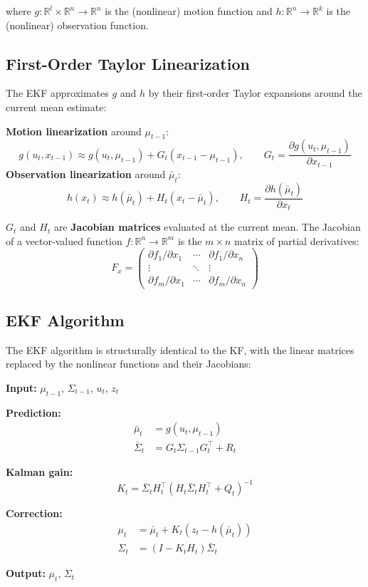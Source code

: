 \documentclass[11pt,a4paper]{article}
\theoremstyle{definition}
\theoremstyle{plain}
\theoremstyle{remark}
\begin{document}
where $g: \mathbb{R}^l \times \mathbb{R}^n \to \mathbb{R}^n$ is the (nonlinear) motion function and $h: \mathbb{R}^n \to \mathbb{R}^k$ is the (nonlinear) observation function.

\subsection{First-Order Taylor Linearization}

The EKF approximates $g$ and $h$ by their first-order Taylor expansions around the current mean estimate:

\begin{tcolorbox}[colback=blue!5!white,colframe=blue!75!black,title=\textbf{EKF Linearization}]
\textbf{Motion linearization} around $\mu_{t-1}$:
\[
g(u_t, x_{t-1}) \approx g(u_t, \mu_{t-1}) + G_t(x_{t-1} - \mu_{t-1}), \qquad G_t = \frac{\partial g(u_t, \mu_{t-1})}{\partial x_{t-1}}
\]
\textbf{Observation linearization} around $\bar{\mu}_t$:
\[
h(x_t) \approx h(\bar{\mu}_t) + H_t(x_t - \bar{\mu}_t), \qquad H_t = \frac{\partial h(\bar{\mu}_t)}{\partial x_t}
\]
\end{tcolorbox}

$G_t$ and $H_t$ are \textbf{Jacobian matrices} evaluated at the current mean. The Jacobian of a vector-valued function $f: \mathbb{R}^n \to \mathbb{R}^m$ is the $m \times n$ matrix of partial derivatives:
\[
F_x = \begin{pmatrix}
\partial f_1/\partial x_1 & \cdots & \partial f_1/\partial x_n \\
\vdots & \ddots & \vdots \\
\partial f_m/\partial x_1 & \cdots & \partial f_m/\partial x_n
\end{pmatrix}
\]

\subsection{EKF Algorithm}

The EKF algorithm is structurally identical to the KF, with the linear matrices replaced by the nonlinear functions and their Jacobians:

\begin{tcolorbox}[colback=blue!5!white,colframe=blue!75!black,title=\textbf{Extended Kalman Filter Algorithm}]
\textbf{Input:} $\mu_{t-1}$, $\Sigma_{t-1}$, $u_t$, $z_t$

\textbf{Prediction:}
\begin{align*}
\bar{\mu}_t &= g(u_t, \mu_{t-1}) \\
\bar{\Sigma}_t &= G_t \Sigma_{t-1} G_t^\top + R_t
\end{align*}

\textbf{Kalman gain:}
\[
K_t = \bar{\Sigma}_t H_t^\top \left(H_t \bar{\Sigma}_t H_t^\top + Q_t\right)^{-1}
\]

\textbf{Correction:}
\begin{align*}
\mu_t &= \bar{\mu}_t + K_t(z_t - h(\bar{\mu}_t)) \\
\Sigma_t &= (I - K_t H_t)\bar{\Sigma}_t
\end{align*}

\textbf{Output:} $\mu_t$, $\Sigma_t$
\end{tcolorbox}
\end{document}
